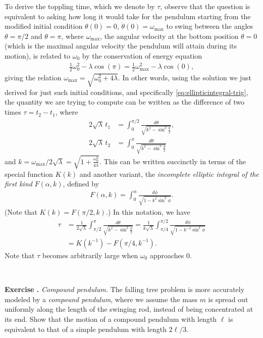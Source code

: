 \documentclass[12pt]{amsart}
\newcommand{\eqst}[1]{\begin{align*}#1\end{align*}}
\newcounter{exercise}
\newcommand{\beginexercise}[1]{\ \\ \addtocounter{exercise}{1} \textbf{Exercise \arabic{exercise}.} \textit{#1.}}
\begin{document}
To derive the toppling time, which we denote by $\tau$, observe that the question is equivalent to asking how long it would take for the pendulum starting from the modified initial condition $\theta(0)=0$, $\dot{\theta}(0)=\omega_{\textrm{max}}$ to swing between the angles $\theta=\pi/2$ and $\theta=\pi$, where $\omega_{\textrm{max}}$, the angular velocity at the bottom position $\theta=0$ (which is the maximal angular velocity the pendulum will attain during its motion), is related to $\omega_0$ by the conservation of energy equation
\eqst{
\tfrac12 \omega_0^2 - \lambda \cos(\pi) = \tfrac12 \omega_{\textrm{max}}^2 - \lambda \cos(0),
}
giving the relation $\omega_{\textrm{max}} = \sqrt{\omega_0^2+4\lambda}$.
In other words, using the solution we just derived for just such initial conditions, and specifically \eqref{eq:ellipticintegral-trig}, the quantity we are trying to compute can be written as the difference of two times $\tau = t_2-t_1$, where 
\eqst{
2 \sqrt{\lambda}\, t_1 &= \int_0^{\pi/2} \frac{d\theta}{\sqrt{k^2-\sin^2\tfrac{\theta}{2}}}, \\
2 \sqrt{\lambda}\, t_2 &= \int_0^{\pi} \frac{d\theta}{\sqrt{k^2-\sin^2\tfrac{\theta}{2}}}
}
and $k=\omega_{\textrm{max}}/2\sqrt{\lambda} = \sqrt{1+\frac{\omega_0^2}{4\lambda}}$. 
This can be written succinctly in terms of the special function $K(k)$ and another variant, the \emph{incomplete elliptic integral of the first kind} $F(\alpha, k)$, defined by
\eqst{
F(\alpha,k) = \int_0^\alpha \frac{d\phi}{\sqrt{1-k^2 \sin^2 \phi}}.
}
(Note that $K(k)=F(\pi/2,k)$.) In this notation, we have
\eqst{
\tau &= \frac{1}{2\sqrt{\lambda}} \int_{\pi/2}^\pi \frac{d\theta}{\sqrt{k^2-\sin^2 \tfrac{\theta}{2}}}
= \frac{1}{k \sqrt{\lambda}} \int_{\pi/4}^{\pi/2} \frac{d\phi}{\sqrt{1-k^{-2}\sin^2 \phi}} \\ &=
K(k^{-1}) - F(\pi/4,k^{-1}). 
}
Note that $\tau$ becomes arbitrarily large when $\omega_0$ approaches $0$.

\beginexercise{Compound pendulum} The falling tree problem is more accurately modeled by a \emph{compound pendulum}, where we assume the mass $m$ is spread out uniformly along the length of the swinging rod, instead of being concentrated at its end. Show that the motion of a compound pendulum with length $\ell$ is equivalent to that of a simple pendulum with length $2\ell/3$.
\end{document}
